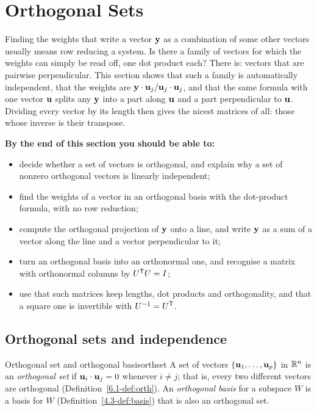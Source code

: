 \documentclass[11pt]{article}
\begin{document}
\section{Orthogonal Sets}

\begin{guide}
Finding the weights that write a vector $\mathbf{y}$ as a combination of some other vectors usually means row reducing a system. Is there a family of vectors for which the weights can simply be read off, one dot product each? There is: vectors that are pairwise perpendicular. This section shows that such a family is automatically independent, that the weights are $\mathbf{y}\cdot\mathbf{u}_j/\mathbf{u}_j\cdot\mathbf{u}_j$, and that the same formula with one vector $\mathbf{u}$ splits any $\mathbf{y}$ into a part along $\mathbf{u}$ and a part perpendicular to $\mathbf{u}$. Dividing every vector by its length then gives the nicest matrices of all: those whose inverse is their transpose.
\end{guide}

\textbf{By the end of this section you should be able to:}
\begin{itemize}
  \item decide whether a set of vectors is orthogonal, and explain why a set of nonzero orthogonal vectors is linearly independent;
  \item find the weights of a vector in an orthogonal basis with the dot-product formula, with no row reduction;
  \item compute the orthogonal projection of $\mathbf{y}$ onto a line, and write $\mathbf{y}$ as a sum of a vector along the line and a vector perpendicular to it;
  \item turn an orthogonal basis into an orthonormal one, and recognise a matrix with orthonormal columns by $U^{\mathsf T} U=I$;
  \item use that such matrices keep lengths, dot products and orthogonality, and that a square one is invertible with $U^{-1}=U^{\mathsf T}$.
\end{itemize}

\subsection*{Orthogonal sets and independence}

\begin{defn}{Orthogonal set and orthogonal basis}{orthset}
A set of vectors $\{\mathbf{u}_1,\dots,\mathbf{u}_p\}$ in $\mathbb{R}^n$ is an \emph{orthogonal set} if $\mathbf{u}_i\cdot\mathbf{u}_j=0$ whenever $i\neq j$; that is, every two different vectors are orthogonal (Definition~\ref{6.1-def:orth}). An \emph{orthogonal basis} for a subspace $W$ is a basis for $W$ (Definition~\ref{4.3-def:basis}) that is also an orthogonal set.
\end{defn}
\end{document}
